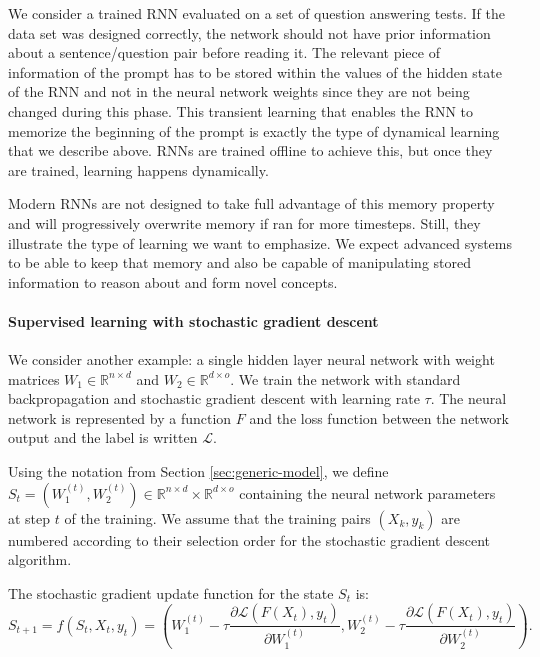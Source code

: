 We consider a trained \ac{RNN} evaluated on a set of question answering tests.
If the data set was designed correctly, the network should not have prior
information about a sentence/question pair before reading it. The relevant piece
of information of the prompt has to be stored within the values of the hidden
state of the \ac{RNN} and not in the neural network weights since they are not
being changed during this phase. This transient learning that enables the
\ac{RNN} to memorize the beginning of the prompt is exactly the type of
dynamical learning that we describe above. \acp{RNN} are trained offline to
achieve this, but once they are trained, learning happens dynamically.

Modern \acp{RNN} are not designed to take full advantage of this memory
property and will progressively overwrite memory if ran for more timesteps.
Still, they illustrate the type of learning we want to emphasize. We expect
advanced systems to be able to keep that memory and also be capable of
manipulating stored information to reason about and form novel concepts.

\paragraph{Supervised learning with stochastic gradient descent}
\label{sec:superv-learn-with}
We consider another example: a single hidden layer neural network with weight
matrices $W_1 \in \mathbb{R}^{n \times d}$ and $W_2 \in \mathbb{R}^{d \times o}$. We train the network with
standard backpropagation and stochastic gradient descent with learning rate $\tau$.
The neural network is represented by a function $F$ and the loss function
between the network output and the label is written $\mathcal{L}$.

Using the notation from Section \ref{sec:generic-model}, we define
$S_{t} = \left(W_{1}^{(t)}, W_{2}^{(t)}\right) \in \mathbb{R}^{n \times d} \times \mathbb{R}^{d \times o}$
containing the neural network parameters at step $t$ of the training. We assume
that the training pairs $(X_{k}, y_{k})$ are numbered according to their
selection order for the stochastic gradient descent algorithm.

The stochastic gradient update function for the state $S_{t}$ is:
\begin{equation}
  \label{eq:supervised-learning}
  S_{t+1} = {f}(S_t, X_t, y_t) = \left(W_1^{(t)} - \tau \frac{\partial
      \mathcal{L}(F(X_t), y_t)}{\partial W_1^{(t)}}, W_2^{(t)} - \tau \frac{\partial
      \mathcal{L}(F(X_t), y_t)}{\partial W_2^{(t)}} \right).
\end{equation}

